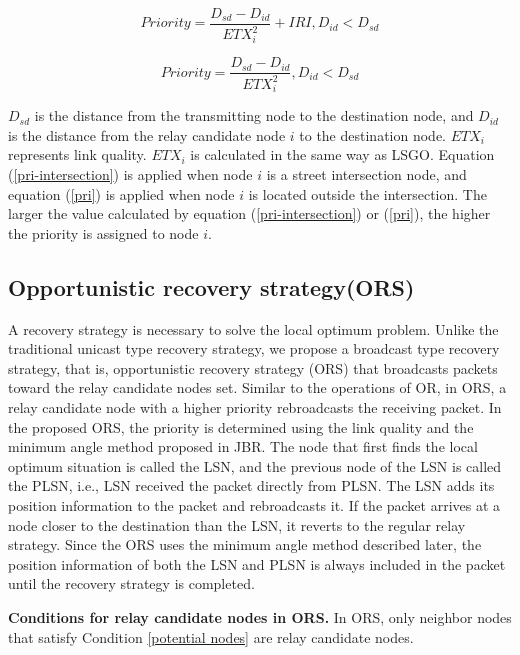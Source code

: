 \documentclass{comex}
\begin{document}
\begin{equation}
\label{pri-intersection}
Priority = \frac{D_{sd} - D_{id}}{ETX_{i}^{2}} + IRI,  D_{id} < D_{sd}
\end{equation}

\begin{equation}
\label{pri}
Priority = \frac{D_{sd} - D_{id}}{ETX_{i}^{2}} ,   D_{id} < D_{sd}
\end{equation}

$D_{sd}$ is the distance from the transmitting node to the destination node, and $D_{id}$ is the distance from the relay candidate node $i$ to the destination node. 
$ETX_i$ represents link quality. $ETX_i$ is calculated in the same way as LSGO. 
Equation (\ref{pri-intersection}) is applied when node $i$ is a street intersection node, and equation (\ref{pri}) is applied when node $i$ is located outside the intersection. 
The larger the value calculated by equation (\ref{pri-intersection}) or (\ref{pri}), the higher the priority is assigned to node $i$. 


\subsection{Opportunistic recovery strategy(ORS)}

A recovery strategy is necessary to solve the local optimum problem. Unlike the traditional unicast type recovery strategy, we propose a broadcast type recovery strategy, that is, opportunistic recovery strategy (ORS) that broadcasts packets toward the relay candidate nodes set. Similar to the operations of OR, in ORS, a relay candidate node with a higher priority rebroadcasts the receiving packet. 
In the proposed ORS, the priority is determined using the link quality and the minimum angle method proposed in JBR. 
The node that first finds the local optimum situation is called the LSN,
and the previous node of the LSN is called the PLSN, i.e., LSN received the packet directly from PLSN. The LSN adds its position information to the packet and rebroadcasts it. If the packet arrives at a node closer to the destination than the LSN, it reverts to the regular relay strategy. Since the ORS uses the minimum angle method described later, the position information of both the LSN and PLSN is always included in the packet until the recovery strategy is completed.






\textbf{Conditions for relay candidate nodes in ORS.} 
In ORS, only neighbor nodes that satisfy Condition \ref{potential nodes} are relay candidate nodes.
\end{document}
